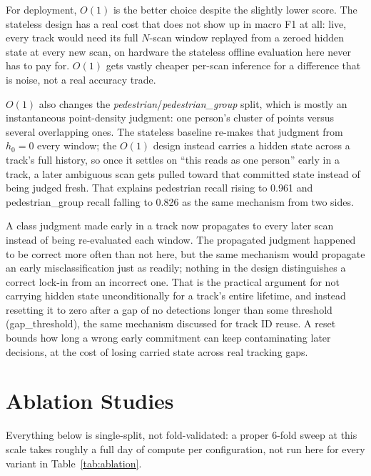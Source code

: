 \documentclass[10pt,letterpaper]{IEEEtran}
\begin{document}
For deployment, $O(1)$ is the better choice despite the slightly lower
score. The stateless design has a real cost that does not show up in macro F1
at all: live, every track would need its full $N$-scan window replayed from a
zeroed hidden state at every new scan, on hardware the stateless offline
evaluation here never has to pay for. $O(1)$ gets vastly cheaper per-scan
inference for a difference that is noise, not a real accuracy trade.

$O(1)$ also changes the \emph{pedestrian}/\emph{pedestrian\_group} split,
which is mostly an instantaneous point-density judgment: one person's
cluster of points versus several overlapping ones. The stateless baseline
re-makes that judgment from $h_0{=}0$ every window; the $O(1)$ design
instead carries a hidden state across a track's full history, so once it
settles on ``this reads as one person'' early in a track, a later ambiguous
scan gets pulled toward that committed state instead of being judged fresh.
That explains pedestrian recall rising to 0.961 and pedestrian\_group recall
falling to 0.826 as the same mechanism from two sides.

A class judgment made early in a track now propagates to every later scan
instead of being re-evaluated each window. The propagated judgment happened
to be correct more often than not here, but the same mechanism would
propagate an early misclassification just as readily; nothing in the design
distinguishes a correct lock-in from an incorrect one. That is the practical argument for not carrying hidden state
unconditionally for a track's entire lifetime, and instead resetting it to
zero after a gap of no detections longer than some threshold
(gap\_threshold), the same mechanism discussed for track ID reuse. A reset
bounds how long a wrong early commitment can keep contaminating later
decisions, at the cost of losing carried state across real tracking gaps.

\section{Ablation Studies}

Everything below is single-split, not fold-validated: a proper 6-fold sweep
at this scale takes roughly a full day of compute per configuration, not run
here for every variant in Table~\ref{tab:ablation}.
\end{document}
